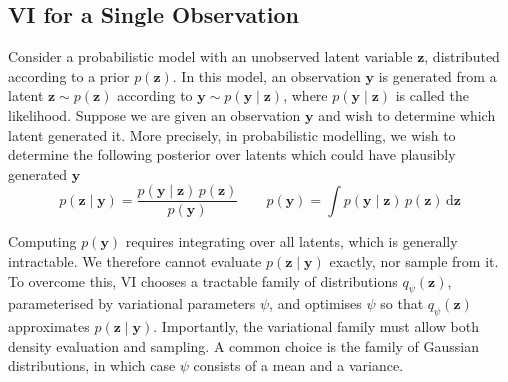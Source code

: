 \documentclass[12pt,a4paper]{report}
\begin{document}
\subsection{VI for a Single Observation}
\label{subsec:vi_single_observation}
Consider a probabilistic model with an unobserved latent variable $\mathbf{z}$, distributed according to a prior $p(\mathbf{z})$. In this model, an observation $\mathbf{y}$ is generated from a latent $\mathbf{z}\sim p(\mathbf{z})$ according to $\mathbf{y}\sim p(\mathbf{y}\mid\mathbf{z})$, where $p(\mathbf{y}\mid\mathbf{z})$ is called the likelihood. Suppose we are given an observation $\mathbf{y}$ and wish to determine which latent generated it. More precisely, in probabilistic modelling, we wish to determine the following posterior over latents which could have plausibly generated $\mathbf{y}$
\begin{equation}
p(\mathbf{z}\mid\mathbf{y})
=
\frac{p(\mathbf{y}\mid\mathbf{z})\,p(\mathbf{z})}{p(\mathbf{y})}
\qquad
p(\mathbf{y})
=
\int p(\mathbf{y}\mid\mathbf{z})\,p(\mathbf{z})\,\mathrm{d}\mathbf{z}
\label{eq:vi_posterior}
\end{equation}

Computing $p(\mathbf{y})$ requires integrating over all latents, which is generally intractable. We therefore cannot evaluate $p(\mathbf{z}\mid\mathbf{y})$ exactly, nor sample from it. To overcome this, VI chooses a tractable family of distributions $q_{\psi}(\mathbf{z})$, parameterised by variational parameters $\psi$, and optimises $\psi$ so that $q_{\psi}(\mathbf{z})$ approximates $p(\mathbf{z}\mid\mathbf{y})$. Importantly, the variational family must allow both density evaluation and sampling. A common choice is the family of Gaussian distributions, in which case $\psi$ consists of a mean and a variance.
\end{document}
